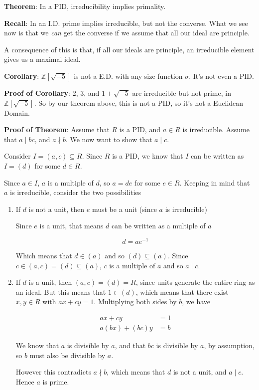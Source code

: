\documentclass[12pt]{article}
\def\Z{{\mathbb Z}}
\theoremstyle{remark}
\theoremstyle{remark}
\theoremstyle{remark}
\theoremstyle{remark}
\theoremstyle{remark}
\begin{document}
{\bf Theorem}: In a PID, irreducibility implies primality.

{\bf Recall}: In an I.D. prime implies irreducible, but not the converse. What
we see now is that we {\it can} get the converse if we assume that all our ideal
are principle.

A consequence of this is that, if all our ideals are principle, an irreducible
element gives us a maximal ideal.

{\bf Corollary}: $\Z[\sqrt{-5}]$ is not a E.D. with any size function $\sigma$.
It's not even a PID.

{\bf Proof of Corollary}: $2$, $3$, and $1 \pm \sqrt{-5}$ are irreducible but
not prime, in $\Z[\sqrt{-5}]$. So by our theorem above, this is not a PID, so
it's not a Euclidean Domain.

{\bf Proof of Theorem}: Assume that $R$ is a PID, and $a \in R$ is
irreducible. Assume that $a \mid bc$, and $a \nmid b$. We now want to show that
$a \mid c$.

Consider $I = (a, c) \subseteq R$. Since $R$ is a PID, we know that $I$ can be
written as $I = (d)$ for some $d \in R$.

Since $a \in I$, $a$ is a multiple of $d$, so $a = de$ for some $e \in R$.
Keeping in mind that $a$ is irreducible, consider the two possibilities

\begin{enumerate}
  \item If $d$ is not a unit, then $e$ must be a unit (since $a$ is irreducible)

    Since $e$ is a unit, that means $d$ can be written as a multiple of $a$

    \[
      d = ae^{-1}
    \]

    Which means that $d \in (a)$ and so $(d) \subseteq (a)$. Since $c \in (a, c)
    = (d) \subseteq (a)$, $c$ is a multiple of $a$ and so $a \mid c$.

  \item If $d$ is a unit, then $(a, c) = (d) = R$, since units generate the
    entire ring as an ideal. But this means that $1 \in (d)$, which means that
    there exist $x, y \in R$ with $ax + cy = 1$. Multiplying both sides by $b$,
    we have

    \begin{align*}
            ax + cy &= 1 \\
      a(bx) + (bc)y &= b
    \end{align*}

    We know that $a$ is divisible by $a$, and that $bc$ is divisible by $a$, by
    assumption, so $b$ must also be divisible by $a$.

    However this contradicts $a \nmid b$, which means that $d$ is not a unit,
    and $a \mid c$. Hence $a$ is prime.
\end{enumerate}
\end{document}
